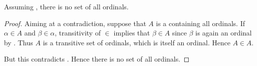 \begin{theorem}\label{thm:burali_forti_paradox}
  Assuming , there is no set of all ordinals.
\end{theorem}
\begin{proof}
  Aiming at a contradiction, suppose that \( A \) is a containing all ordinals. If \( \alpha \in A \) and \( \beta \in \alpha \), transitivity of \( \in \) implies that \( \beta \in A \) since \( \beta \) is again an ordinal by . Thus \( A \) is a transitive set of ordinals, which  is itself an ordinal. Hence \( A \in A \).

  But this contradicts . Hence there is no set of all ordinals.
\end{proof}

